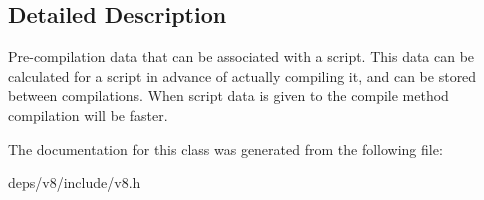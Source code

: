 \subsection{Detailed Description}
Pre-\/compilation data that can be associated with a script. This data can be calculated for a script in advance of actually compiling it, and can be stored between compilations. When script data is given to the compile method compilation will be faster. 

The documentation for this class was generated from the following file\+:\begin{DoxyCompactItemize}
\item 
deps/v8/include/v8.\+h\end{DoxyCompactItemize}
